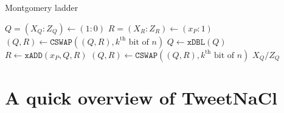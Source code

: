 \documentclass[8pt,aspectratio=169]{beamer}
\begin{document}
%
%



%
%
\begin{frame}[fragile]{Montgomery ladder}
  \begin{algorithm}[H]
  \caption{Montgomery ladder for scalar mult.}
  \begin{algorithmic}
    \STATE $Q = (X_Q:Z_Q) \leftarrow (1:0)$
    \STATE $R = (X_R:Z_R) \leftarrow (x_P:1)$
      \STATE $(Q,R) \leftarrow \texttt{CSWAP}((Q,R), k^{\text{th}}\text{ bit of }n)$
      \STATE $Q \leftarrow \texttt{xDBL}(Q)$
      \STATE $R \leftarrow \texttt{xADD}(x_P,Q,R)$
      \STATE $(Q,R) \leftarrow \texttt{CSWAP}((Q,R), k^{\text{th}}\text{ bit of }n)$
    \ENDFOR
    \RETURN $X_Q/Z_Q$
  \end{algorithmic}
  \end{algorithm}
\end{frame}



\section{A quick overview of TweetNaCl}
\end{document}
